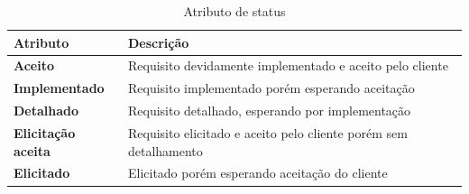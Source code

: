 \begin{table}[h]
\begin{tabular}{|p{4cm}|p{11cm}|}

\hline
\textbf{Atributo} &
\textbf{Descrição}
\\ \hline

\textbf{Aceito} &
Requisito devidamente implementado e aceito pelo cliente
\\ \hline

\textbf{Implementado} &
Requisito implementado porém esperando aceitação
\\ \hline

\textbf{Detalhado} &
Requisito detalhado, esperando por implementação
\\ \hline

\textbf{Elicitação aceita} &
Requisito elicitado e aceito pelo cliente porém sem detalhamento
\\ \hline

\textbf{Elicitado} &
Elicitado porém esperando aceitação do cliente
\\ \hline

\end{tabular}
\caption{Atributo de status}
\label{tab:atributo_status}
\end{table}